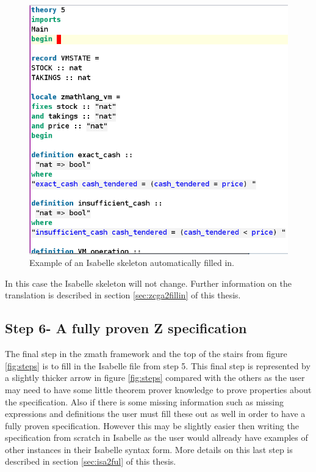 \begin{figure}[H]
 \begin{center}
 \includegraphics [scale=0.3]{Figures/Design/fillin1.png}
 \caption{Example of an Isabelle skeleton automatically filled in.}
 \label{fig:fillin1}
\end{center}
\end{figure} 

 In this case the Isabelle skeleton will not change. Further information on the translation is described in section \ref{sec:zcga2fillin} of this thesis.

\subsection{Step 6- A fully proven Z specification}

The final step in the \gls{zmath} framework and the top of the stairs from figure \ref{fig:steps} is to fill in the Isabelle file from step 5. This final step is represented by a slightly thicker arrow in figure \ref{fig:steps} compared with the others as the user may need to have some little theorem prover knowledge to prove properties about the specification. Also if there is some missing information such as missing expressions and definitions the user must fill these out as well in order to have a fully proven specification. However this may be slightly easier then writing the specification from scratch in Isabelle as the user would allready have examples of other instances in their Isabelle syntax form. More details on this last step is described in section \ref{sec:isa2ful} of this thesis.

